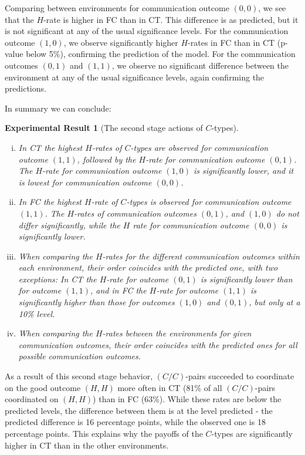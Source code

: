 \documentclass[12pt]{article}
\theoremstyle{break}
\newtheorem{result}{Experimental Result}\theoremstyle{break}
\begin{document}
Comparing between environments for communication outcome $(0,0)$, we see that the $H$-rate is higher in FC than in CT. This difference is as predicted, but it is not significant at any of the usual significance levels. For the communication outcome $(1,0)$, we observe significantly higher $H$-rates in FC than in CT (p-value below 5\%), confirming the prediction of the model. For the communication outcomes $(0,1)$ and $(1,1)$, we observe no significant difference between the environment at any of the usual significance levels, again confirming the predictions. 

In summary we can conclude: 
\begin{result}[The second stage actions of $C$-types]
	\begin{enumerate}[i)]\setlength\itemsep{0em}
		\item In CT the highest $H$-rates of $C$-types are observed for communication outcome $(1,1)$, followed by the $H$-rate for communication outcome $(0,1)$. The $H$-rate for communication outcome $(1,0)$ is significantly lower, and it is lowest for communication outcome $(0,0)$.
		\item In FC the highest $H$-rate of $C$-types is observed for communication outcome $(1,1)$. The $H$-rates of communication outcomes $(0,1)$, and $(1,0)$ do not differ significantly, while the $H$ rate for communication outcome $(0,0)$ is significantly lower. 
		\item When comparing the $H$-rates for the different communication outcomes within each environment, their order coincides with the predicted one, with two exceptions: In CT the $H$-rate for outcome $(0,1)$ is significantly lower than for outcome $(1,1)$, and in FC the $H$-rate for outcome $(1,1)$ is significantly higher than those for outcomes $(1,0)$ and $(0,1)$, but only at a 10\% level.
		\item When comparing the $H$-rates between the environments for given communication outcomes, their order coincides with the predicted ones for all possible communication outcomes.
	\end{enumerate}
\end{result}
%

As a result of this second stage behavior, $(C/C)$-pairs succeeded to coordinate on the good outcome $(H,H)$ more often in CT (81\% of all $(C/C)$-pairs coordinated on $(H,H)$) than in FC (63\%). While these rates are below the predicted levels, the difference between them is at the level predicted - the predicted difference is 16 percentage points, while the observed one is 18 percentage points. This explains why the payoffs of the $C$-types are significantly higher in CT than in the other environments.
\end{document}
